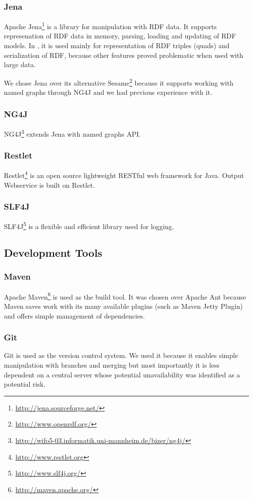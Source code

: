 \subsubsection*{Jena}
Apache Jena\footnote{\url{http://jena.sourceforge.net/}} is a library for manipulation with RDF data. It supports represenation of RDF data in memory, parsing, loading and updating of RDF models. In \odcs, it is used mainly for representation of RDF triples (quads) and serialization of RDF, because other features proved problematic when used with large data.

We chose Jena over its alternative Sesame\footnote{\url{http://www.openrdf.org/}} because it supports working with named graphs through NG4J and we had previous experience with it.

\subsubsection*{NG4J}
NG4J\footnote{\url{http://wifo5-03.informatik.uni-mannheim.de/bizer/ng4j/}} extends Jena with named graphs API.

\subsubsection*{Restlet}
Restlet\footnote{\url{http://www.restlet.org}} is an open source lightweight RESTful web framework for Java. Output Webservice is built on Restlet.

\subsubsection*{SLF4J}
SLF4J\footnote{\url{http://www.slf4j.org/}} is a flexible and efficient library used for logging. 

\subsection{Development Tools}
\subsubsection*{Maven}
Apache Maven\footnote{\url{http://maven.apache.org/}} is used as the build tool. It was chosen over Apache Ant because Maven saves work with its many available plugins (such as Maven Jetty Plugin) and offers simple management of dependencies.

\subsubsection*{Git}
Git is used as the version control system. We used it because it enables simple manipulation with branches and merging but most importantly it is less dependent on a central server whose potential unavailability was identified as a potential risk.



